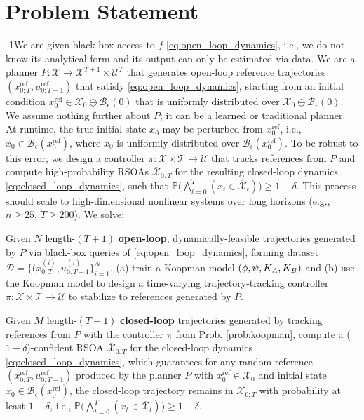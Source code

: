 
\section{Problem Statement}
\label{problem_statement}
\looseness-1We are given black-box access to $f$ \eqref{eq:open_loop_dynamics}, i.e., we do not know its analytical form and its output can only be estimated via data. We are a planner $P: \mathcal{X} \rightarrow \mathcal{X}^{T+1} \times \mathcal{U}^T$ that generates open-loop reference trajectories $(x^\textrm{ref}_{0:T}, u^\textrm{ref}_{0:T-1})$ that satisfy \eqref{eq:open_loop_dynamics}, starting from an initial condition $x_0^\textrm{ref} \in \mathcal{X}_0 \ominus \mathcal{B}_\epsilon(0)$ that is uniformly distributed over $\mathcal{X}_0 \ominus \mathcal{B}_\epsilon(0)$.  We assume nothing further about $P$; it can be a learned or traditional planner. At runtime, the true initial state $x_0$ may be perturbed from $x_0^\textrm{ref}$, i.e., $x_0 \in \mathcal{B}_\epsilon(x_0^\textrm{ref})$, where $x_0$ is uniformly distributed over $\mathcal{B}_\epsilon(x_0^\textrm{ref})$. To be robust to this error, we design a controller $\pi: \mathcal{X}\times \mathcal{T}\rightarrow \mathcal{U}$ that tracks references from $P$ and compute high-probability RSOAs $\overline{\mathcal{X}}_{0:T}$ for the resulting closed-loop dynamics \eqref{eq:closed_loop_dynamics}, such that $\mathbb{P}\big(\bigwedge_{t=0}^T (x_t \in \overline{\mathcal{X}}_t) \big) \ge 1-\delta$. This process should scale to high-dimensional nonlinear systems over long horizons (e.g., $n \ge 25$, $T \ge 200$). We solve:
\begin{problem}\label{prob:koopman}
Given $N$ length-$(T+1)$ \textbf{open-loop}, dynamically-feasible trajectories generated by $P$ via black-box queries of \eqref{eq:open_loop_dynamics}, forming dataset $\mathcal{D}=\{(x_{0:T}^{(i)},u_{0:T-1}^{(i)}\}_{i=1}^N$, (a) train a Koopman model $(\phi,\psi,K_{A},K_{B})$ and (b) use the Koopman model to design a time-varying trajectory-tracking controller $\pi: \mathcal{X} \times \mathcal{T} \rightarrow \mathcal{U}$ to stabilize to references generated by $P$.
\end{problem}
\begin{problem}\label{prob:verification}
Given $M$ length-$(T+1)$ \textbf{closed-loop} trajectories generated by tracking references from $P$ with the controller $\pi$ from Prob. \ref{prob:koopman}, compute a ($1-\delta$)-confident RSOA $\overline{\mathcal{X}}_{0:T}$ for the closed-loop dynamics \eqref{eq:closed_loop_dynamics}, which guarantees for any random reference $(x^\textrm{ref}_{0:T}, u^\textrm{ref}_{0:T-1})$ produced by the planner $P$ with $x_0^\textrm{ref} \in \mathcal{X}_0$ and initial state $x_0 \in \mathcal{B}_\epsilon(x_0^\textrm{ref})$, the closed-loop trajectory remains in $\overline{\mathcal{X}}_{0:T}$ with probability at least $1-\delta$, i.e., $\mathbb{P}\big(\bigwedge_{t=0}^T (x_t \in \overline{\mathcal{X}}_t) \big) \ge 1-\delta$.
\end{problem}
 
